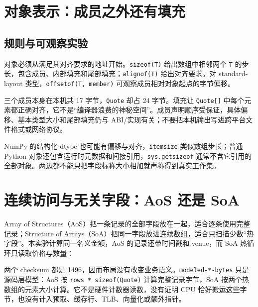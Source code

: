 \section{对象表示：成员之外还有填充}

\subsection{规则与可观察实验}

对象必须从满足其对齐要求的地址开始。\texttt{sizeof(T)} 给出数组中相邻两个 \texttt{T} 的步长，包含成员、内部填充和尾部填充；\texttt{alignof(T)} 给出对齐要求。对 standard-layout 类型，\texttt{offsetof(T, member)} 可观察成员相对对象起点的字节偏移。



三个成员本身在本机共 17 字节，\texttt{Quote} 却占 24 字节。填充让 \texttt{Quote[]} 中每个元素都正确对齐，它不是“编译器浪费的神秘空间”。成员声明顺序受保证，具体偏移、基本类型大小和尾部填充仍与 ABI/实现有关；不要把本机输出写进跨平台文件格式或网络协议。

\begin{pythonbridge}
NumPy 的结构化 dtype 也可能有偏移与对齐，\texttt{itemsize} 类似数组步长；普通 Python 对象还包含运行时元数据和间接引用，\texttt{sys.getsizeof} 通常不含它引用的全部对象。两边都不能只把字段标称大小相加就声称得到真实工作集。

\end{pythonbridge}

\section{连续访问与无关字段：AoS 还是 SoA}

Array of Structures（AoS）把一条记录的全部字段放在一起，适合逐条使用完整记录；Structure of Arrays（SoA）把同一字段放进连续数组，适合只扫描少数“热字段”。本实验计算同一名义金额，AoS 的记录还带时间戳和 venue，而 SoA 热循环只读取价格与数量：



两个 checksum 都是 1496，因而布局没有改变业务语义。\texttt{modeled-*-bytes} 只是源码层模型：AoS 按 \texttt{rows * sizeof(Quote)} 计算完整记录字节，SoA 按两个热数组的元素大小计算。它不是硬件计数器读数，没有证明 CPU 恰好搬运这些字节，也没有计入预取、缓存行、TLB、向量化或额外指针。

